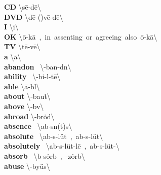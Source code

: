 \documentclass[10pt,a4paper]{article}
\begin{document}
\begin{multicols}{2}
\noindent\textbf{CD }\quad \textbackslash \textsecstress s\={e}-\textprimstress d\={e}\textbackslash \\
\textbf{ DVD }\quad \textbackslash \textsecstress d\={e}-(\textsecstress )v\={e}-\textprimstress d\={e}\textbackslash \\
\textbf{ I }\quad \textbackslash \textprimstress \={i}\textbackslash \\
\textbf{ OK }\quad \textbackslash \={o}-\textprimstress k\={a}\ ,\ in\ assenting\ or\ agreeing\ also\ \textprimstress \={o}-\textsecstress k\={a}\textbackslash \\
\textbf{ TV }\quad \textbackslash \textprimstress t\={e}-\textprimstress v\={e}\textbackslash \\
\textbf{ a }\quad \textbackslash \textprimstress \={a}\textbackslash \\
\textbf{ abandon }\quad \ \textbackslash \textschwa -\textprimstress ban-d\textschwa n\textbackslash \\
\textbf{ ability }\quad \ \textbackslash \textschwa -\textprimstress bi-l\textschwa -t\={e}\textbackslash \\
\textbf{ able }\quad \textbackslash \textprimstress \={a}-b\textschwa l\textbackslash \\
\textbf{ about }\quad \textbackslash \textschwa -\textprimstress bau\. t\textbackslash \\
\textbf{ above }\quad \textbackslash \textschwa -\textprimstress b\textschwa v\textbackslash \\
\textbf{ abroad }\quad \textbackslash \textschwa -\textprimstress br\.{o}d\textbackslash \\
\textbf{ absence }\quad \ \textbackslash \textprimstress ab-s\textschwa n(t)s\textbackslash \\
\textbf{ absolute }\quad \ \textbackslash \textprimstress ab-s\textschwa -\textsecstress l\"{u}t\ ,\ \textsecstress ab-s\textschwa -\textprimstress l\"{u}t\textbackslash \\
\textbf{ absolutely }\quad \ \textbackslash \textprimstress ab-s\textschwa -\textsecstress l\"{u}t-l\={e}\ ,\ \textsecstress ab-s\textschwa -\textprimstress l\"{u}t-\textbackslash \\
\textbf{ absorb }\quad \ \textbackslash \textschwa b-\textprimstress s\.{o}rb\ ,\ -\textprimstress z\.{o}rb\textbackslash \\
\textbf{ abuse }\quad \textbackslash \textschwa -\textprimstress by\"{u}s\textbackslash \\

\end{multicols}
\end{document}
